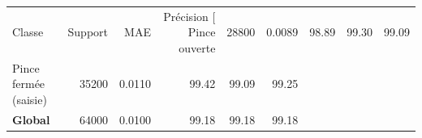 \begin{tabular}{lrrrrr}
\toprule
Classe & Support & MAE & Précision [%
\midrule
Pince ouverte & 28800 & 0.0089 & 98.89 & 99.30 & 99.09 \\
Pince fermée (saisie) & 35200 & 0.0110 & 99.42 & 99.09 & 99.25 \\
\midrule
\textbf{Global} & 64000 & 0.0100 & 99.18 & 99.18 & 99.18 \\
\bottomrule
\end{tabular}
